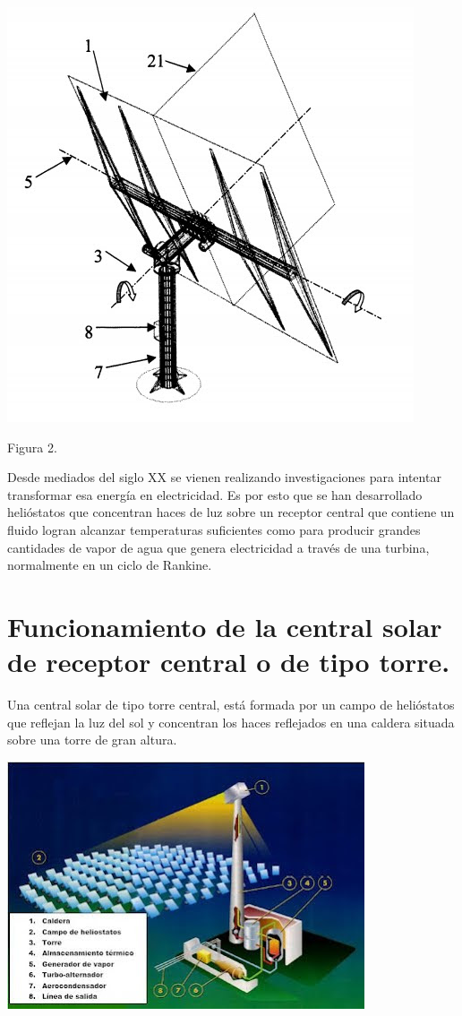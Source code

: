 \includegraphics[scale=1]{unnamed.jpg}
\cite{OepmWebSite}

Figura 2.

Desde mediados del siglo XX se vienen realizando investigaciones para intentar transformar esa energía en electricidad. Es por esto que se han desarrollado helióstatos que concentran haces de luz sobre un receptor central que contiene un fluido logran alcanzar temperaturas suficientes como para producir grandes cantidades de vapor de agua que genera electricidad a través de una turbina, normalmente en un ciclo de Rankine.

\cite{GstriatumWebSite} \cite{EcuRedWebSite}

\section{Funcionamiento de la central solar de receptor central o de tipo torre.}

Una central solar de tipo torre central, está formada por un campo de helióstatos que reflejan la luz del sol y concentran los haces reflejados en una caldera situada sobre una torre de gran altura.

\includegraphics[scale=1]{unnamed (2).jpg}

